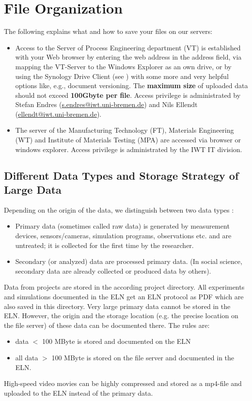 \section{File Organization}
The following explains what and how to save your files on our servers:
\begin{itemize}
  \item Access to the Server of Process Engineering department (VT) is established with your Web browser by entering the web address in the address field, via mapping the VT-Server to the Windows Explorer as an own drive, or by using the Synology Drive Client (see \cite{synology2022}) with some more and very helpful options like, e.g., document versioning. The \textbf{maximum size} of uploaded data should not exceed \textbf{100Gbyte per file}. Access privilege is administrated by Stefan Endres (\href{mailto:s.endres@iwt.uni-bremen.de}{s.endres@iwt.uni-bremen.de}) and Nils Ellendt (\href{mailto:ellendt@iwt.uni-bremen.de}{ellendt@iwt.uni-bremen.de}).
  \item The server of the Manufacturing Technology (FT), Materials Engineering (WT) and Institute of Materials Testing (MPA) are accessed via browser or windows explorer. Access privilege is administrated by the IWT IT division.
\end{itemize}

\subsection{Different Data Types and Storage Strategy of Large Data}
Depending on the origin of the data, we distinguish between two data types \cite{gitelman2013}:
\begin{itemize}
  \item Primary data (sometimes called raw data) is generated by measurement
        devices, sensors/cameras, simulation programs, observations etc. and
        are untreated; it is collected for the first time by the researcher.
  \item Secondary (or analyzed) data are processed primary data. (In social
        science, secondary data are already collected or produced data by
        others).
\end{itemize}
Data from projects are stored in the according project directory. All experiments and simulations documented in the ELN get an ELN protocol as PDF which are also saved in this directory. Very large primary data cannot be stored in the ELN. However, the origin and the storage location (e.g. the precise location on the file server) of these data can be documented there. The rules are:
\begin{itemize}
  \item data $<$ 100 MByte is stored and documented on the ELN
  \item all data $>$ 100 MByte is stored on the file server and documented
        in the ELN.
\end{itemize}
High-speed video movies can be highly compressed and stored as a mp4-file and uploaded to the ELN instead of the primary data.

